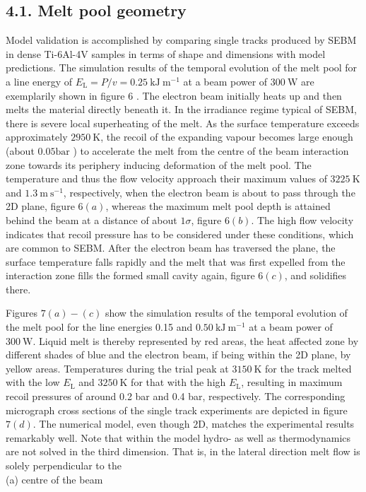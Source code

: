 \documentclass[10pt]{article}
\begin{document}
\subsection*{4.1. Melt pool geometry}
Model validation is accomplished by comparing single tracks produced by SEBM in dense Ti-6Al-4V samples in terms of shape and dimensions with model predictions. The simulation results of the temporal evolution of the melt pool for a line energy of $E_{\mathrm{L}}=P / v=0.25 \mathrm{~kJ} \mathrm{~m}^{-1}$ at a beam power of $300 \mathrm{~W}$ are exemplarily shown in figure 6 . The electron beam initially heats up and then melts the material directly beneath it. In the irradiance regime typical of SEBM, there is severe local superheating of the melt. As the surface temperature exceeds approximately $2950 \mathrm{~K}$, the recoil of the expanding vapour becomes large enough (about $0.05 \mathrm{bar}$ ) to accelerate the melt from the centre of the beam interaction zone towards its periphery inducing deformation of the melt pool. The temperature and thus the flow velocity approach their maximum values of $3225 \mathrm{~K}$ and $1.3 \mathrm{~m} \mathrm{~s}^{-1}$, respectively, when the electron beam is about to pass through the 2D plane, figure $6(a)$, whereas the maximum melt pool depth is attained behind the beam at a distance of about $1 \sigma$, figure $6(b)$. The high flow velocity indicates that recoil pressure has to be considered under these conditions, which are common to SEBM. After the electron beam has traversed the plane, the surface temperature falls rapidly and the melt that was first expelled from the interaction zone fills the formed small cavity again, figure $6(c)$, and solidifies there.

Figures $7(a)-(c)$ show the simulation results of the temporal evolution of the melt pool for the line energies 0.15 and $0.50 \mathrm{~kJ} \mathrm{~m}^{-1}$ at a beam power of $300 \mathrm{~W}$. Liquid melt is thereby represented by red areas, the heat affected zone by different shades of blue and the electron beam, if being within the 2D plane, by yellow areas. Temperatures during the trial peak at $3150 \mathrm{~K}$ for the track melted with the low $E_{\mathrm{L}}$ and $3250 \mathrm{~K}$ for that with the high $E_{\mathrm{L}}$, resulting in maximum recoil pressures of around 0.2 bar and 0.4 bar, respectively. The corresponding micrograph cross sections of the single track experiments are depicted in figure $7(d)$. The numerical model, even though $2 \mathrm{D}$, matches the experimental results remarkably well. Note that within the model hydro- as well as thermodynamics are not solved in the third dimension. That is, in the lateral direction melt flow is solely perpendicular to the\\
(a) centre of the beam
\end{document}

